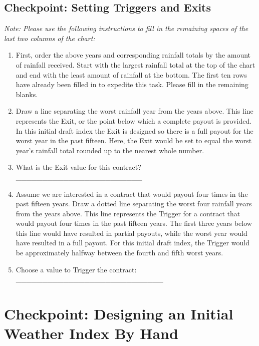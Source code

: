 \documentclass[letterpaper,10pt,english]{sphinxmanual}
\begin{document}
\subsection{Checkpoint: Setting Triggers and Exits}
\label{whatisindexinsurance/conceptsbehindindexdesign_en_Web:checkpoint-setting-triggers-and-exits}
\emph{Note: Please use the following instructions to fill in the remaining spaces of the last two columns of the chart:}
\begin{enumerate}
\item {} 
First, order the above years and corresponding rainfall totals by the amount of rainfall received. Start with the largest rainfall total at the top of the chart and end with the least amount of rainfall at the bottom. The first ten rows have already been filled in to expedite this task. Please fill in the remaining blanks.

\item {} 
Draw a line separating the worst rainfall year from the years above. This line represents the Exit, or the point below which a complete payout is provided. In this initial draft index the Exit is designed so there is a full payout for the worst year in the past fifteen. Here, the Exit would be set to equal the worst year's rainfall total rounded up to the nearest whole number.

\item {} 
What is the Exit value for this contract? \_\_\_\_\_\_\_\_\_\_\_\_\_\_\_\_\_\_\_\_\_\_\_\_

\item {} 
Assume we are interested in a contract that would payout four times in the past fifteen years.  Draw a dotted line separating the worst four rainfall years from the years above. This line represents the Trigger for a contract that would payout four times in the past fifteen years. The first three years below this line would have resulted in partial payouts, while the worst year would have resulted in a full payout. For this initial draft index, the Trigger would be approximately halfway between the fourth and fifth worst years.

\item {} 
Choose a value to Trigger the contract: \_\_\_\_\_\_\_\_\_\_\_\_\_\_\_\_\_\_\_\_\_\_\_\_\_\_\_\_

\end{enumerate}


\section{Checkpoint: Designing an Initial Weather Index By Hand}
\label{whatisindexinsurance/designingindexbyhand::doc}\label{whatisindexinsurance/designingindexbyhand:checkpoint-designing-an-initial-weather-index-by-hand}
\end{document}
